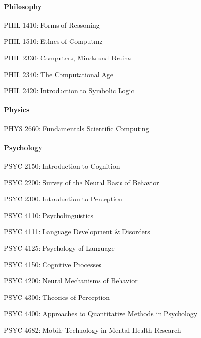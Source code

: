 \paragraph{Philosophy}
\begin{itemlist}
\item PHIL 1410: Forms of Reasoning
\item PHIL 1510: Ethics of Computing
\item PHIL 2330: Computers, Minds and Brains
\item PHIL 2340: The Computational Age
\item PHIL 2420: Introduction to Symbolic Logic
\end{itemlist}


\paragraph{Physics}
\begin{itemlist}
\item PHYS 2660: Fundamentals Scientific Computing
\end{itemlist}


\paragraph{Psychology}
\begin{itemlist}
\item PSYC 2150: Introduction to Cognition
\item PSYC 2200: Survey of the Neural Basis of Behavior
\item PSYC 2300: Introduction to Perception
\item PSYC 4110: Psycholinguistics
\item PSYC 4111: Language Development \& Disorders
\item PSYC 4125: Psychology of Language
\item PSYC 4150: Cognitive Processes
\item PSYC 4200: Neural Mechanisms of Behavior
\item PSYC 4300: Theories of Perception
\item PSYC 4400: Approaches to Quantitative Methods in Psychology
\item PSYC 4682: Mobile Technology in Mental Health Research
\end{itemlist}


